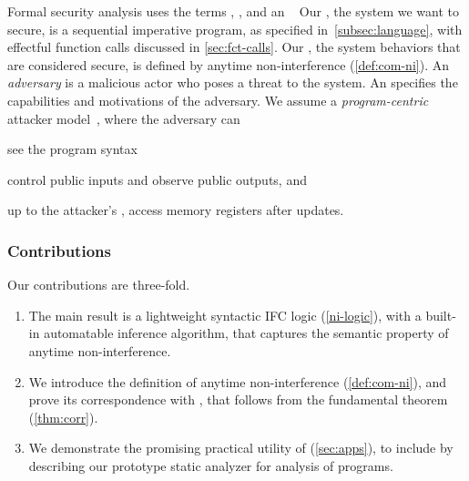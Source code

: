 Formal security analysis uses the terms
, , and an ~\cite{bau2011,bognar2022} Our \emph{}, \ie the system
we want to secure, is a sequential imperative program, as specified in~\autoref{subsec:language}, with effectful function calls discussed in \autoref{sec:fct-calls}. Our
\emph{}, \ie the system behaviors that are considered
secure, is defined by anytime non-interference
(\autoref{def:com-ni}). An \emph{adversary} is a
malicious actor who poses a threat to the system. An \emph{}
specifies the capabilities and motivations of the adversary. We assume a
\emph{program-centric} attacker model~\cite{hedin2012}, where the adversary can
\begin{enumerate*}[label=(\roman*)]
\item see the program syntax
\item control public inputs and observe public outputs, and
\item up to the attacker's , access memory registers after
updates.
\end{enumerate*}

\subsubsection{Contributions}
Our contributions are three-fold.

\begin{enumerate}
\item The main result is a lightweight syntactic IFC logic \lname
(\autoref{ni-logic}), with a built-in automatable inference algorithm, that
captures the semantic property of anytime
non-interference.

\item We introduce the definition of anytime
non-interference (\autoref{def:com-ni}), and
prove its correspondence with \lname, that follows from the fundamental theorem
(\autoref{thm:corr}).

\item We demonstrate the promising practical utility of \lname
(\autoref{sec:apps}), to include by describing our prototype static analyzer
\tool for analysis of \texttt{} programs. \end{enumerate}

